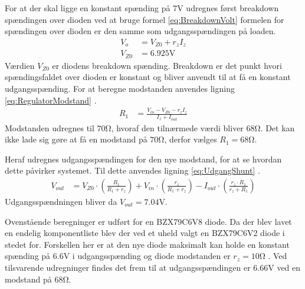 For at der skal ligge en konstant spænding på $7 \si{\volt}$ udregnes først breakdown spændingen over dioden ved at bruge formel \ref{eq:BreakdownVolt} \cite[Side. 146]{Sedra19uu} formelen for spændingen over dioden er den samme som udgangsspændingen på loaden. 
\begin{align}
	V_o & = V_{Z0} + r_z I_z \label{eq:BreakdownVolt} \\
	V_{Z0} & = 6.925 \si{\volt}
	\end{align}
Værdien $V_{Z0}$ er diodens breakdown spænding.
Breakdown er det punkt hvori spændingsfaldet over dioden er konstant og bliver anvendt til at få en konstant udgangsspænding.
For at beregne modstanden anvendes ligning \ref{eq:RegulatorModstand} \cite[Side. 149]{Sedra19uu}.
\begin{align}
	R_1 & = \frac{V_{in}-V_{Z0}-r_z I_z}{I_z+I_{out}} \label{eq:RegulatorModstand}
\end{align}
Modstanden udregnes til $70 \si{\ohm}$, hvoraf den tilnærmede værdi bliver $68 \si{\ohm}$.
Det kan ikke lade sig gøre at få en modstand på $70 \si{\ohm}$, derfor vælges $R_1 = 68 \si{\ohm}$.

Heraf udregnes udgangsspændingen for den nye modstand, for at se hvordan dette påvirker systemet.
Til dette anvendes ligning \ref{eq:UdgangShunt} \cite[Side. 149]{Sedra19uu}.
\begin{align}
	V_{out} & = V_{Z0} \cdot \left( \frac{R_1}{R_1+r_z} \right) + V_{in} \cdot \left( \frac{r_z}{R_1+r_z} \right) - I_{out} \cdot \left( \frac{r_z \cdot R_1}{r_z+R_1} \right) \label{eq:UdgangShunt}
\end{align}
Udgangsspændningen bliver da $V_{out} = 7.04 \si{\volt}$.

Ovenstående beregninger er udført for en BZX79C6V8 diode. 
Da der blev lavet en endelig komponentliste blev der ved et uheld valgt en BZX79C6V2 diode i stedet for. 
Forskellen her er at den nye diode maksimalt kan holde en konstant spænding på $6.6 \si{\volt}$ i udgangsspænding og diode modstanden er $r_z = 10 \si{\ohm}$ \cite[Side. 1 Kolonne 11]{ZenerDiode}.
Ved tilsvarende udregninger findes det frem til at udgangsspændingen er $6.66 \si{\volt}$ ved en modstand på $68 \si{\ohm}$.
